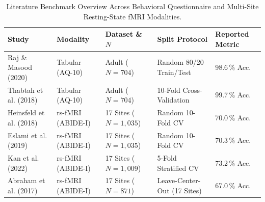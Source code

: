 \begin{table}[t]
\centering
\caption{Literature Benchmark Overview Across Behavioral Questionnaire and Multi-Site Resting-State fMRI Modalities.}
\label{tab:literature_audit}
\footnotesize
\setlength{\tabcolsep}{6pt}
\begin{tabular}{lllll}
\toprule
\textbf{Study} & \textbf{Modality} & \textbf{Dataset \& $N$} & \textbf{Split Protocol} & \textbf{Reported Metric} \\
\midrule
Raj \& Masood (2020) \cite{raj2020} & Tabular (AQ-10) & Adult ($N = 704$) & Random 80/20 Train/Test & 98.6\,\% Acc. \\
Thabtah et al. (2018) \cite{thabtah2018ijmi} & Tabular (AQ-10) & Adult ($N = 704$) & 10-Fold Cross-Validation & 99.7\,\% Acc. \\
Heinsfeld et al. (2018) \cite{heinsfeld2018} & rs-fMRI (ABIDE-I) & 17 Sites ($N = 1{,}035$) & Random 10-Fold CV & 70.0\,\% Acc. \\
Eslami et al. (2019) \cite{eslami2019} & rs-fMRI (ABIDE-I) & 17 Sites ($N = 1{,}035$) & Random 10-Fold CV & 70.3\,\% Acc. \\
Kan et al. (2022) \cite{kan2022bnt} & rs-fMRI (ABIDE-I) & 17 Sites ($N = 1{,}009$) & 5-Fold Stratified CV & 73.2\,\% Acc. \\
Abraham et al. (2017) \cite{abraham2017} & rs-fMRI (ABIDE-I) & 17 Sites ($N = 871$) & Leave-Center-Out (17 Sites) & 67.0\,\% Acc. \\
\bottomrule
\end{tabular}
\end{table}
